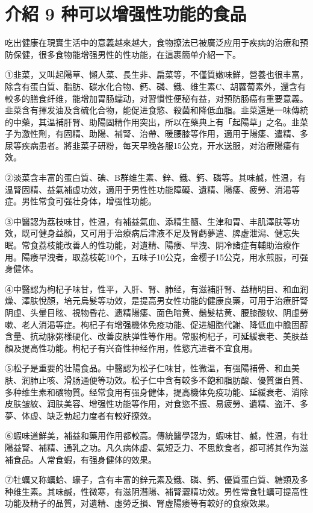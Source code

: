 \documentclass[12pt,UTF8]{ctexbook}
\begin{document}
\section{介紹 9 种可以增强性功能的食品}

吃出健康在現實生活中的意義越來越大，食物撩法已被廣泛应用于疾病的治療和預防保健，很多食物能增强男性的性功能，在這裹簡单介紹一下。

①韭菜，又叫起陽草、懶人菜、長生非、扁菜等，不僅質嫩味鮮，營養也很丰富，除含有蛋白質、脂肪、碳水化合物、鈣、磷、鐵、维生素C、胡蘿蔔素外，還含有較多的膳食纤维，能增加胃肠蠕动，对習慣性便秘有益，对預防肠癌有重要意義。韭菜含有揮发油及含硫化合物，能促进食慾、殺菌和降低血脂。韭菜還是一味傳統的中藥，其温補肝腎、助陽固精作用突出，所以在藥典上有「起陽草」之名。韭菜子为激性劑，有固精、助陽、補腎、治帶、暖腰膝等作用，適用于陽痿、遣精、多尿等疾病患者。將韭菜子研粉，每天早晚各服15公克，开水送服，对治療陽痿有效。

②淡菜含丰富的蛋白質、碘、B群维生素、鋅、鐵、鈣、磷等。其味鹹，性温，有温腎固精、益氣補虚功效，適用于男性性功能障礙、遺精、陽痿、疲勞、消渴等症。男性常食可强壮身体，增强性功能。

③中醫認为荔枝味甘，性温，有補益氣血、添精生髓、生津和胃、丰肌澤肤等功效，既可健身益顏，又可用于治療病后津液不足及腎虧夢遣、脾虚泄潟、健忘失眠。常食荔枝能改善人的性功能，对遺精、陽痿、早洩、阴冷諸症有輔助治療作用。陽痿早洩者，取荔枝乾10个，五味子10公克，金樱子15公克，用水煎服，可强身健体。

④中醫認为枸杞子味甘，性平，入肝、腎、肺经，有滋補肝腎、益精明目、和血润燥、澤肤悅顏，培元烏髮等功效，是提高男女性功能的健康良藥，可用于治療肝腎阴虛、头暈目眩、視物昏花、遗精陽痿、面色暗黄、鬚髮枯黄、腰膝酸软、阴虛勞嗽、老人消渴等症。枸杞子有增强機体免疫功能、促进細胞代謝、降低血中膽固醇含量、抗动脉粥樣硬化、改善皮肤弹性等作用。常服枸杞子，可延緩衰老、美肤益顏及提高性功能。枸杞子有兴奋性神经作用，性慾亢进者不宜食用。

⑤松子是重要的壮陽食品。中醫認为松子仁味甘，性微温，有强陽補骨、和血美肤、润肺止咳、滑肠通便等功效。松子仁中含有較多不飽和脂肪酸、優質蛋白質、多种维生素和礦物質。经常食用有强身健体，提高機体免疫功能、延緩衰老、消除皮肤皱紋、润肤美容、增强性功能等作用，对食慾不振、易疲勞、遺精、盗汗、多夢、体虚、缺乏勃起力度者有較好撩效。

⑥蝦味道鮮美，補益和藥用作用都較高。傳統醫學認为，蝦味甘、鹹，性温，有壮陽益腎、補精、通乳之功。凡久病体虚、氣短乏力、不思飲食者，都可將其作为滋補食品。人常食蝦，有强身健体的效果。

⑦牡蠣又称蠣蛤、蠔子，含有丰富的鋅元素及鐵、磷、鈣、優質蛋白質、糖類及多种维生素。其味鹹，性微寒，有滋阴潛陽、補腎澀精功效。男性常食牡蠣可提高性功能及精子的品質，对遺精、虛勞乏損、腎虛陽痿等有較好的食療效果。
\end{document}
